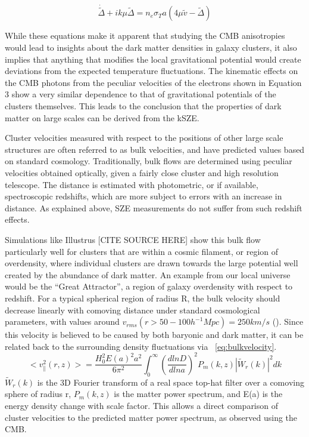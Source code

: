 \documentclass[manuscript]{aastex}
\begin{document}
\begin{equation}
\dot{\tilde \Delta} + ik\mu \tilde\Delta = n_{e} \sigma_{T} a (4 \mu \tilde v - \tilde \Delta)
\end{equation}

While these equations make it apparent that studying the CMB anisotropies would lead to insights about the dark matter densities in galaxy clusters, it also implies that anything that modifies the local gravitational potential would create deviations from the expected temperature fluctuations. The kinematic effects on the CMB photons from the peculiar velocities of the electrons shown in Equation 3 show a very similar dependence to that of gravitational potentials of the clusters themselves. This leads to the conclusion that the properties of dark matter on large scales can be derived from the kSZE. 

Cluster velocities measured with respect to the positions of other large scale structures are often referred to as bulk velocities, and have predicted values based on standard cosmology.  Traditionally, bulk flows are determined using peculiar velocities obtained optically, given a fairly close cluster and high resolution telescope. The distance is estimated with photometric, or if available, spectroscopic redshifts, which are more subject to errors with an increase in distance. As explained above, SZE measurements do not suffer from such redshift effects.

Simulations like Illustrus [CITE SOURCE HERE] show this bulk flow particularly well for clusters that are within a cosmic filament, or region of overdensity, where individual clusters are drawn towards the large potential well created by the abundance of dark matter. An example from our local universe would be the ``Great Attractor'', a region of galaxy overdensity with respect to redshift. For a typical spherical region of radius R, the bulk velocity should decrease linearly with comoving distance under standard cosmological parameters, with values around \(v_{rms}(r > 50-100  h^{-1} Mpc) = 250 km/s\) (\cite{Mak2011}). Since this velocity is believed to be caused by both baryonic and dark matter, it can be related back to the surrounding density fluctuations via ~\ref{eq:bulkvelocity}. 
\begin{equation}\label{eq:bulkvelocity}
 <v^{2}_{\parallel}(r,z)> = \frac{H_{0}^{2}E(a)^{2}a^{2}}{6\pi^{2}} \int_{0}^{\infty} (\frac{d ln D}{d ln a})^{2} P_{m}(k,z)|\tilde{W}_{r}(k)|^{2} dk
 \end{equation}
\(\tilde{W}_{r}(k)\) is the 3D Fourier transform of a real space top-hat filter over a comoving sphere of radius r, \(P_{m}(k,z)\) is the matter power spectrum, and E(a) is the energy density change with scale factor. This allows a direct comparison of cluster velocities to the predicted matter power spectrum, as observed using the CMB.
\end{document}
